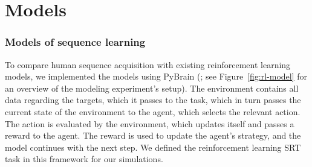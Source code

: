 \documentclass[man,floatsintext]{apa6}
\begin{document}

\section{Models}


\subsubsection{Models of sequence learning}

To compare human sequence acquisition with existing reinforcement learning models, we implemented the models using PyBrain (; see Figure~\ref{fig:rl-model} for an overview of the modeling experiment's setup). The environment contains all data regarding the targets, which it passes to the task, which in turn passes the current state of the environment to the agent, which selects the relevant action. The action is evaluated by the environment, which updates itself and passes a reward to the agent. The reward is used to update the agent's strategy, and the model continues with the next step. We defined the reinforcement learning SRT task in this framework for our simulations.
\end{document}
